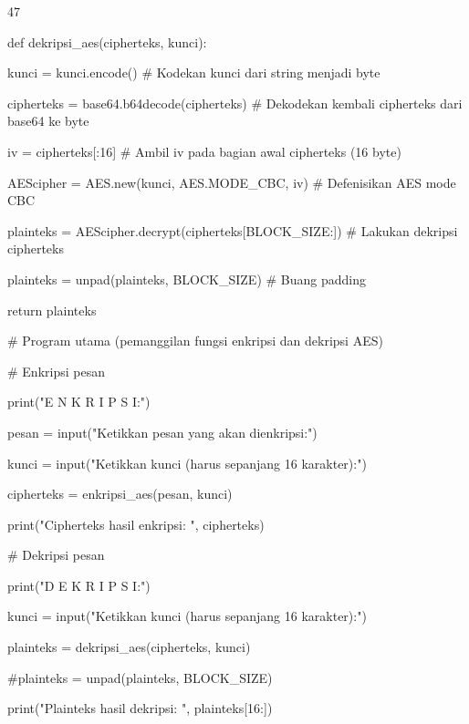 \documentclass{article}
\begin{document}

47

def dekripsi\_aes(cipherteks, kunci):

    kunci = kunci.encode()                        \# Kodekan kunci dari string menjadi byte

    cipherteks = base64.b64decode(cipherteks)     \# Dekodekan kembali cipherteks dari base64 ke byte 

    iv = cipherteks[:16]                          \# Ambil iv pada bagian awal cipherteks (16 byte)

    AEScipher = AES.new(kunci, AES.MODE\_CBC, iv)  \# Defenisikan AES mode CBC 

    plainteks = AEScipher.decrypt(cipherteks[BLOCK\_SIZE:])     \# Lakukan dekripsi cipherteks

    plainteks = unpad(plainteks, BLOCK\_SIZE)      \# Buang padding

    return plainteks  

\# Program utama (pemanggilan fungsi enkripsi dan dekripsi AES)

\# Enkripsi pesan 

print("E N K R I P S I:")

pesan = input("Ketikkan pesan yang akan dienkripsi:")

kunci = input("Ketikkan kunci (harus sepanjang 16 karakter):")

cipherteks = enkripsi\_aes(pesan, kunci)

print("Cipherteks hasil enkripsi: ", cipherteks)

\# Dekripsi pesan

print("D E K R I P S I:")

kunci = input("Ketikkan kunci (harus sepanjang 16 karakter):")

plainteks = dekripsi\_aes(cipherteks, kunci)

\#plainteks = unpad(plainteks, BLOCK\_SIZE)

print("Plainteks hasil dekripsi: ", plainteks[16:])
\end{document}
